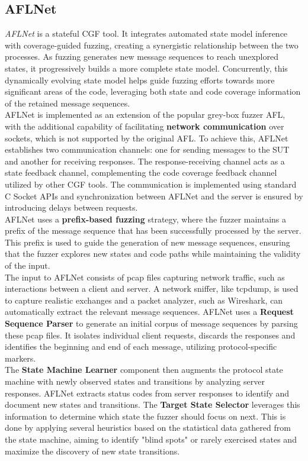 \subsection{AFLNet}
\textit{AFLNet} \cite{AFLNet} is a stateful CGF tool. It integrates automated state model inference with coverage-guided fuzzing, creating a synergistic relationship between the two processes. As fuzzing generates new message sequences to reach unexplored states, it progressively builds a more complete state model. Concurrently, this dynamically evolving state model helps guide fuzzing efforts towards more significant areas of the code, leveraging both state and code coverage information of the retained message sequences.
\\AFLNet is implemented as an extension of the popular grey-box fuzzer AFL, with the additional capability of facilitating \textbf{network communication} over sockets, which is not supported by the original AFL. To achieve this, AFLNet establishes two communication channels: one for sending messages to the SUT and another for receiving responses. The response-receiving channel acts as a state feedback channel, complementing the code coverage feedback channel utilized by other CGF tools. The communication is implemented using standard C Socket APIs and synchronization between AFLNet and the server is ensured by introducing delays between requests.
\\AFLNet uses a \textbf{prefix-based fuzzing} strategy, where the fuzzer maintains a prefix of the message sequence that has been successfully processed by the server. This prefix is used to guide the generation of new message sequences, ensuring that the fuzzer explores new states and code paths while maintaining the validity of the input.
\\The input to AFLNet consists of pcap files capturing network traffic, such as interactions between a client and server. A network sniffer, like tcpdump, is used to capture realistic exchanges and a packet analyzer, such as Wireshark, can automatically extract the relevant message sequences. AFLNet uses a \textbf{Request Sequence Parser} to generate an initial corpus of message sequences by parsing these pcap files. It isolates individual client requests, discards the responses and identifies the beginning and end of each message, utilizing protocol-specific markers.
\\The \textbf{State Machine Learner} component then augments the protocol state machine with newly observed states and transitions by analyzing server responses. AFLNet extracts status codes from server responses to identify and document new states and transitions. The \textbf{Target State Selector} leverages this information to determine which state the fuzzer should focus on next. This is done by applying several heuristics based on the statistical data gathered from the state machine, aiming to identify "blind spots" or rarely exercised states and maximize the discovery of new state transitions.
